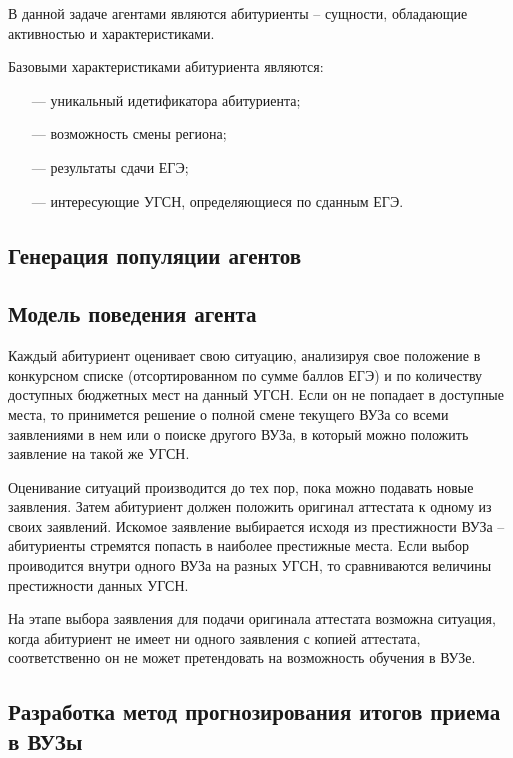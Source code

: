В данной задаче агентами являются абитуриенты – сущности, обладающие активностью и характеристиками.

Базовыми характеристиками абитуриента являются:

\begin{itemize}[leftmargin=1.6\parindent]
	\item[---] уникальный идетификатора абитуриента;
	\item[---] возможность смены региона;
	\item[---] результаты сдачи ЕГЭ;
	\item[---] интересующие УГСН, определяющиеся по сданным ЕГЭ.

\end{itemize}


\subsection{Генерация популяции агентов}



\subsection{Модель поведения агента}

Каждый абитуриент оценивает свою ситуацию, анализируя свое положение в конкурсном списке (отсортированном по сумме баллов ЕГЭ) и по количеству доступных бюджетных мест на данный УГСН. Если он не попадает в доступные места, то принимется решение о полной смене текущего ВУЗа со всеми заявлениями в нем или о поиске другого ВУЗа, в который можно положить заявление на такой же УГСН.

Оценивание ситуаций производится до тех пор, пока можно подавать новые заявления. Затем абитуриент должен положить оригинал аттестата к одному из своих заявлений. Искомое заявление выбирается исходя из престижности ВУЗа – абитуриенты стремятся попасть в наиболее престижные места. Если выбор проиводится внутри одного ВУЗа на разных УГСН, то сравниваются величины престижности данных УГСН. 

На этапе выбора заявления для подачи оригинала аттестата возможна ситуация, когда абитуриент не имеет ни одного заявления с копией аттестата, соответственно он не может претендовать на возможность обучения в ВУЗе.

\subsection{Разработка метод прогнозирования итогов приема в ВУЗы}

